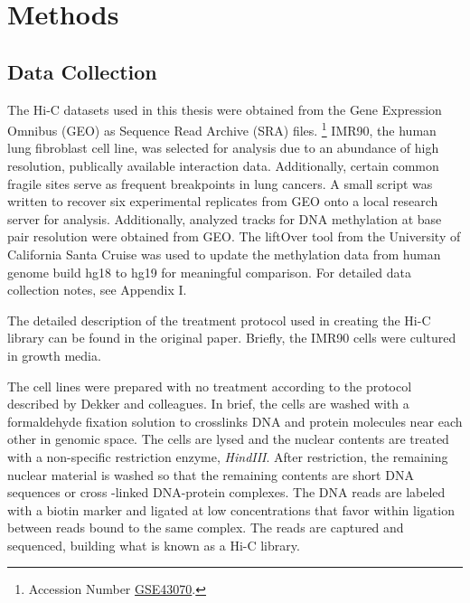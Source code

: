 \documentclass[phd,tocprelim]{cornell}
\begin{document}


\chapter{Methods}

\section{Data Collection}

The Hi-C datasets used in this thesis were obtained from the Gene
Expression Omnibus (GEO)\cite{edgar2002} as Sequence Read Archive (SRA) files.%
\footnote{Accession Number \href{http://www.ncbi.nlm.nih.gov/geo/query/acc.cgi?acc=GSE43070}{GSE43070}.}
IMR90, the human lung fibroblast cell line, was selected for analysis due to
an abundance of high resolution, publically available interaction data.
Additionally, certain common fragile sites serve as frequent breakpoints in
lung cancers\cite{tunca2002}\cite{dhillon2003}.  A small script was written to
recover six experimental replicates from GEO onto a local research server for
analysis.  Additionally, analyzed tracks for DNA methylation at base pair
resolution were obtained from GEO\cite{lister2009}.  The liftOver tool from
the University of California Santa Cruise was used to update the methylation
data from human genome build hg18 to hg19 for meaningful comparison\cite{hinrichs2006}.
For detailed data collection notes, see Appendix I.

The detailed description of the treatment protocol used in creating the Hi-C
library can be found in the original paper\cite{ren2013}.  Briefly, the IMR90
cells were cultured in growth media.

The cell lines were prepared with no treatment according to the protocol
described by Dekker and colleagues\cite{dekker2013}.  In brief, the cells
are washed with a formaldehyde fixation solution to crosslinks DNA and
protein molecules near each other in genomic space.  The cells are
lysed and the nuclear contents are treated with a non-specific restriction
enzyme, \textit{HindIII}.  After restriction, the remaining nuclear material
is washed so that the remaining contents are short DNA sequences or cross
-linked DNA-protein complexes.  The DNA reads are labeled with a biotin
marker and ligated at low concentrations that favor within ligation between
reads bound to the same complex.  The reads are captured and sequenced,
building what is known as a Hi-C library.
\end{document}
